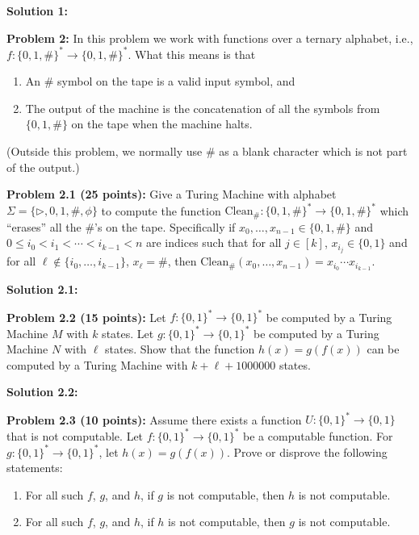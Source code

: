 \documentclass[11pt]{article}
\begin{document}
\textbf{Solution 1:} 

\textbf{Problem 2:} In this problem we work with functions over a ternary alphabet, i.e., $f:\{0,1,\#\}^* \to  \{0,1,\#\}^*$. What this means is that
\begin{enumerate}
\item An $\#$ symbol on the tape is a valid input symbol, and 
\item The output of the machine is the concatenation of all the symbols from $\{0,1,\#\}$ on the tape when the machine halts. 
\end{enumerate}
(Outside this problem, we normally use $\#$ as a blank character which is not part of the output.)

\newcommand{\Clean}{\mathrm{Clean}}

\textbf{Problem 2.1 (25 points):} Give a Turing Machine with alphabet $\Sigma = \{\triangleright, 0,1, \#, \phi\}$ to compute the function $\Clean_\#:\{0,1,\#\}^* \to \{0,1,\#\}^*$ which ``erases'' all the $\#$'s on the tape. Specifically if $x_0,\ldots,x_{n-1} \in \{0,1,\#\}$ and $0 \leq i_0 < i_1 < \cdots < i_{k-1} < n$ are indices such that for all $j \in [k]$, $x_{i_j} \in \{0,1\}$ and for all $\ell \not\in \{i_0,\ldots,i_{k-1}\}$, $x_\ell = \#$, then $\Clean_\#(x_0,\ldots,x_{n-1}) = x_{i_0}\cdots x_{i_{k-1}}$. 

\textbf{Solution 2.1:} 

\textbf{Problem 2.2 (15 points):} Let $f:\{0,1\}^* \to \{0,1\}^*$ be computed by a Turing Machine $M$ with $k$ states. Let $g: \{0,1\}^* \to \{0,1\}^*$ be computed by a Turing Machine $N$ with $\ell$ states. Show that the function $h(x) = g(f(x))$ can be computed by a Turing Machine with $k+\ell + 1000000$ states. 

\textbf{Solution 2.2:} 

\pagebreak

\textbf{Problem 2.3 (10 points):} Assume there exists a function $U:\{0,1\}^* \to \{0,1\}$ that is not computable. Let $f:\{0,1\}^*\to \{0,1\}^*$ be a computable function. For $g:\{0,1\}^* \to \{0,1\}^*$, let $h(x) = g(f(x))$. Prove or disprove the following statements:

\begin{enumerate}
	\item For all such $f$, $g$, and $h$, if $g$ is not computable, then $h$ is not computable.
	\item For all such $f$, $g$, and $h$, if $h$ is not computable, then $g$ is not computable.
\end{enumerate}
\end{document}
